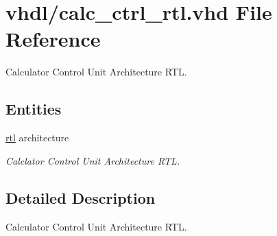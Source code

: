 \hypertarget{calc__ctrl__rtl_8vhd}{}\section{vhdl/calc\+\_\+ctrl\+\_\+rtl.vhd File Reference}
\label{calc__ctrl__rtl_8vhd}


Calculator Control Unit Architecture R\+TL.  


\subsection*{Entities}
\begin{DoxyCompactItemize}
\item 
\hyperlink{classcalc__ctrl_1_1rtl}{rtl} architecture
\begin{DoxyCompactList}\small\item\em Calclator Control Unit Architecture R\+TL. \end{DoxyCompactList}\end{DoxyCompactItemize}


\subsection{Detailed Description}
Calculator Control Unit Architecture R\+TL. 

